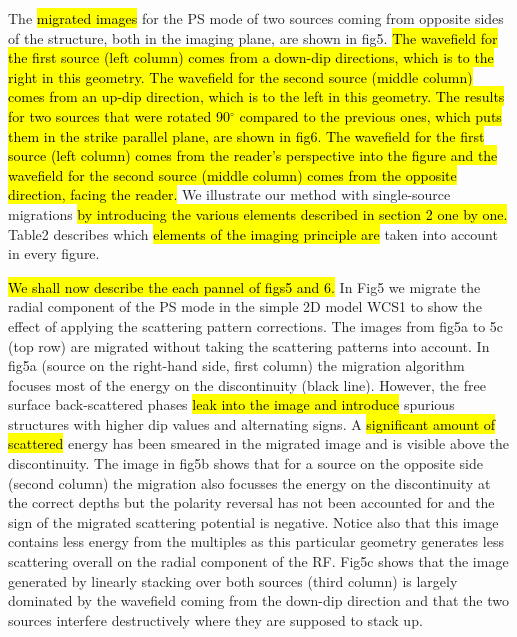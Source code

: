 \documentclass[10pt,a4paper]{article}
\begin{document}
The \hl{migrated images} for the PS mode of two sources coming from opposite sides of the structure, both in the imaging plane, are shown in fig5.
\hl{The wavefield for the first source (left column) comes from a down-dip directions, which is to the right in this geometry.
The wavefield for the second source (middle column) comes from an up-dip direction, which is to the left in this geometry.
The results for two sources that were rotated 90$^{\circ}$ compared to the previous ones, which puts them in the strike parallel plane, are shown in fig6.
The wavefield for the first source (left column) comes from the reader's perspective into the figure and the wavefield for the second source (middle column) comes from the opposite direction, facing the reader.}
We illustrate our method with single-source migrations \hl{by introducing the various elements described in section 2 one by one.}
Table2 describes which \hl{elements of the imaging principle are} taken into account in every figure.

\hl{We shall now describe the each pannel of figs5 and 6.}
In Fig5 we migrate the radial component of the PS mode in the simple 2D model WCS1 to show the effect of applying the scattering pattern corrections.
The images from fig5a to 5c (top row) are migrated without taking the scattering patterns into account.
In fig5a (source on the right-hand side, first column) the migration algorithm focuses most of the energy on the discontinuity (black line).
However, the free surface back-scattered phases \hl{leak into the image and introduce} spurious structures with higher dip values and alternating signs.
A \hl{significant amount of scattered} energy has been smeared in the migrated image and is visible above the discontinuity.
The image in fig5b shows that for a source on the opposite side (second column) the migration also focusses the energy on the discontinuity at the correct depths but the polarity reversal has not been accounted for and the sign of the migrated scattering potential is negative.
Notice also that this image contains less energy from the multiples as this particular geometry generates less scattering overall on the radial component of the RF.
Fig5c shows that the image generated by linearly stacking over both sources (third column) is largely dominated by the wavefield coming from the down-dip direction and that the two sources interfere destructively where they are supposed to stack up.
\end{document}
